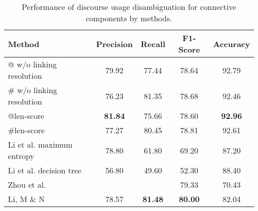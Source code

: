 \begin{table}[ht]
\centering
\begin{tabular}{|l|c|c|c|c|}
\hline

\bf Method                    & \bf Precision & \bf Recall & \bf F1-Score & \bf Accuracy \\ \hline
    @ w/o linking resolution  &     79.92     &     77.44  &     78.64    &     92.79    \\ \hline
    \# w/o linking resolution &     76.23     &     81.35  &     78.68    &     92.46    \\ \hline
    @len-score                & \bf 81.84     &     75.66  &     78.60    & \bf 92.96    \\ \hline
    \#len-score               &     77.27     &     80.45  &     78.81    &     92.61    \\

\hhline{|=|=|=|=|=|}

    Li et al. maximum entropy &     78.80     &     61.80  &     69.20    &     87.20    \\ \hline
    Li et al. decision tree   &     56.80     &     49.60  &     52.30    &     88.40    \\

\hhline{|=|=|=|=|=|}

    Zhou et al.               &               &            &     79.33    &     70.43    \\ \hline
    Li, M \& N                &     78.57     & \bf 81.48  & \bf 80.00    &     82.04    \\ \hline

\end{tabular}
\caption{\label{t:recognition-methods} Performance of discourse usage
disambiguation for connective components by methods. }
\end{table}
